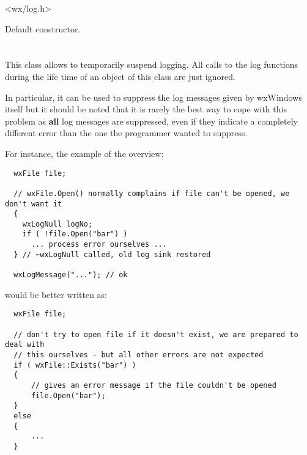 


<wx/log.h>




Default constructor.


\section{}\label{wxlognull}

This class allows to temporarily suspend logging. All calls to the log
functions during the life time of an object of this class are just ignored.

In particular, it can be used to suppress the log messages given by wxWindows
itself but it should be noted that it is rarely the best way to cope with this
problem as {\bf all} log messages are suppressed, even if they indicate a
completely different error than the one the programmer wanted to suppress.

For instance, the example of the overview:

{\small
\begin{verbatim}
  wxFile file;

  // wxFile.Open() normally complains if file can't be opened, we don't want it
  {
    wxLogNull logNo;
    if ( !file.Open("bar") )
      ... process error ourselves ...
  } // ~wxLogNull called, old log sink restored

  wxLogMessage("..."); // ok
\end{verbatim}
}

would be better written as:

{\small
\begin{verbatim}
  wxFile file;

  // don't try to open file if it doesn't exist, we are prepared to deal with
  // this ourselves - but all other errors are not expected
  if ( wxFile::Exists("bar") )
  {
      // gives an error message if the file couldn't be opened
      file.Open("bar");
  }
  else
  {
      ...
  }
\end{verbatim}
}

